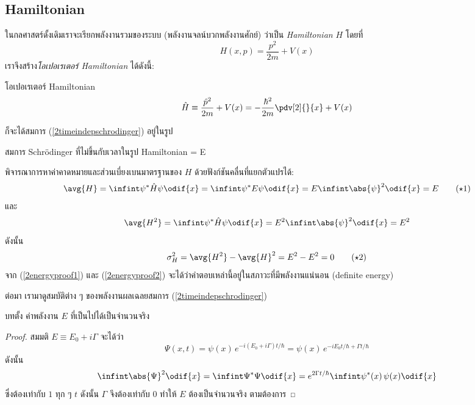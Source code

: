 \subsection{Hamiltonian}

ในกลศาสตร์ดั้งเดิมเราจะเรียกพลังงานรวมของระบบ (พลังงานจลน์บวกพลังงานศักย์) ว่าเป็น \emph{Hamiltonian} $H$ โดยที่
\[
H(x, p) = \frac{p^2}{2m} + V(x)
\]
เราจึงสร้าง\emph{โอเปอเรเตอร์ Hamiltonian} ได้ดังนี้:
\begin{defbox}{โอเปอเรเตอร์ Hamiltonian}
    \begin{equation}
        \hat{H} \equiv \frac{\hat{p}^2}{2m} + V(x) = -\frac{\hbar^2}{2m}\pdv[2]{}{x} + V(x)
    \end{equation}
\end{defbox}
ก็จะได้สมการ (\ref{2timeindepschrodinger}) อยู่ในรูป
\begin{eqbox}{สมการ Schrödinger ที่ไม่ขึ้นกับเวลาในรูป Hamiltonian}
    \psi = E\psi
\end{eqbox}

พิจารณาการหาค่าคาดหมายและส่วนเบี่ยงเบนมาตรฐานของ $H$ ด้วยฟังก์ชันคลื่นที่แยกตัวแปรได้:
\begin{equation}
    \avg{H} = \infint \psi^*\hat{H}\psi\odif{x} = \infint \psi^* E\psi\odif{x} = E \infint \abs{\psi}^2 \odif{x} = E\tag{$\star$1}\label{2energyproof1}
\end{equation}
และ
\[
\avg{H^2} = \infint \psi^*\hat{H}\psi\odif{x} = E^2\infint\abs{\psi}^2\odif{x} = E^2
\]
ดังนั้น
\begin{equation}
    \sigma_H^2 = \avg{H^2} - \avg{H}^2 = E^2 - E^2 = 0\tag{$\star$2}\label{2energyproof2}
\end{equation}
จาก (\ref{2energyproof1}) และ (\ref{2energyproof2}) จะได้ว่าคำตอบเหล่านี้อยู่ในสภาวะที่มีพลังงานแน่นอน (definite energy)

ต่อมา เรามาดูสมบัติต่าง ๆ ของพลังงานผลเฉลยสมการ (\ref{2timeindepschrodinger})

\begin{corbox}{บทตั้ง}
    ค่าพลังงาน $E$ ที่เป็นไปได้เป็นจำนวนจริง
\end{corbox}
\begin{proof}
    สมมติ $E \equiv E_0 + i\Gamma$ จะได้ว่า
    \[
    \Psi(x, t) = \psi(x)\,e^{-i(E_0 + i\Gamma)t/\hbar} = \psi(x)\,e^{-iE_0t/\hbar + \Gamma t/\hbar}
    \]
    ดังนั้น
    \[
    \infint \abs{\Psi}^2\odif{x} = \infint \Psi^*\Psi\odif{x} = e^{2\Gamma t/\hbar}\infint \psi^*(x)\,\psi(x)\odif{x}
    \]
    ซึ่งต้องเท่ากับ $1$ ทุก ๆ $t$ ดังนั้น $\Gamma$ จึงต้องเท่ากับ $0$ ทำให้ $E$ ต้องเป็นจำนวนจริง ตามต้องการ
\end{proof}

